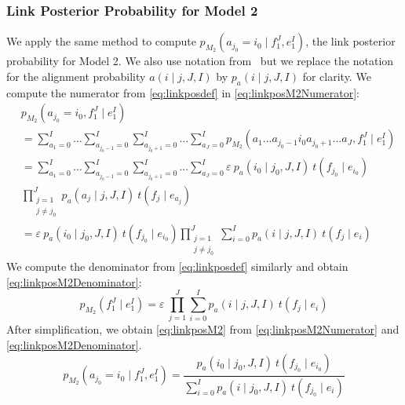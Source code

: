 \subsubsection{Link Posterior Probability for Model 2}
We apply the same method to compute $p_{M_2}(a_{j_0} = i_0 \mid f_1^J, e_1^I)$, the
link posterior probability for Model 2. We also use
notation from~\citep{brown-dellapietra-dellapietra-mercer-1993} but
we replace the notation for the alignment probability $a(i \mid j, J, I)$
by $p_a(i \mid j, J, I)$ for clarity.
We compute the numerator from \autoref{eq:linkposdef} in
\autoref{eq:linkposM2Numerator}:
%
\begin{align}
  & p_{M_2}(a_{j_0}=i_0,f_1^J \mid e_1^I) \nonumber \\
  &= \sum_{a_1 = 0}^{I} ... \sum_{a_{j_0-1} = 0}^{I} \sum_{a_{j_0+1} = 0}^{I} ... \sum_{a_J = 0}^{I} p_{M_2}(a_1 ... a_{j_0-1} i_0 a_{j_0+1} ... a_J,f_1^J \mid e_1^I) \nonumber \\
  &= \sum_{a_1 = 0}^{I} ... \sum_{a_{j_0-1} = 0}^{I} \sum_{a_{j_0+1} = 0}^{I} ... \sum_{a_J = 0}^{I} \varepsilon \ p_a(i_0 \mid j_0, J, I) \ t(f_{j_0} \mid e_{i_0}) \nonumber \\
  & \prod_{\substack{j = 1 \\ j \neq j_0}}^J p_a(a_j \mid j, J, I) \ t(f_j \mid e_{a_j}) \nonumber \\
  &= \varepsilon \ p_a(i_0 \mid j_0, J, I) \ t(f_{j_0} \mid e_{i_0}) \prod_{\substack{j = 1 \\ j \neq j_0}}^J \sum_{i=0}^I p_a(i \mid j, J, I) \ t(f_j \mid e_i) \label{eq:linkposM2Numerator}
\end{align}
%
We compute the denominator from \autoref{eq:linkposdef} similarly and obtain
\autoref{eq:linkposM2Denominator}:
%
\begin{equation} \label{eq:linkposM2Denominator}
  p_{M_2}(f_1^J \mid e_1^I) = \varepsilon \ \prod_{j=1}^J \sum_{i=0}^I p_a(i \mid j, J, I) \ t(f_j \mid e_i)
\end{equation}
%
After simplification, we obtain \autoref{eq:linkposM2} from
\autoref{eq:linkposM2Numerator} and \autoref{eq:linkposM2Denominator}.
%
\begin{equation} \label{eq:linkposM2}
  p_{M_2}(a_{j_0} = i_0 \mid f_1^J, e_1^I) = \frac{p_a(i_0 \mid j_0, J, I) \ t(f_{j_0} \mid e_{i_0})}{\sum_{i=0}^I p_a(i \mid j_0, J, I) \ t(f_{j_0} \mid e_i)}
\end{equation}
%

